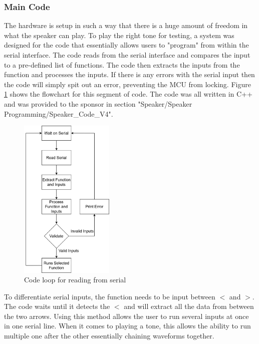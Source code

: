 \subsubsection{Main Code}
The hardware is setup in such a way that there is a huge amount of freedom in what the speaker can play. To play the right tone for testing, a system was designed for the code that essentially allows users to "program" from within the serial interface. The code reads from the serial interface and compares the input to a pre-defined list of functions. The code then extracts the inputs from the function and processes the inputs. If there is any errors with the serial input then the code will simply spit out an error, preventing the MCU from locking. Figure \ref{fig:L_Code_Loop} shows the flowchart for this segment of code. The code was all written in C++ and was provided to the sponsor in section "Speaker/Speaker Programming/Speaker\_Code\_V4". \\
\begin{figure} [!htb]
	\hfill\includegraphics[width=0.4\textwidth]{./images/speaker/L_Code_Loop}\hspace{\fill}
	\caption{Code loop for reading from serial}
	\label{fig:L_Code_Loop}
\end{figure} 

To differentiate serial inputs, the function needs to be input between $<$ and $>$. The code waits until it detects the $<$ and will extract all the data from between the two arrows. Using this method allows the user to run several inputs at once in one serial line. When it comes to playing a tone, this allows the ability to run multiple one after the other essentially chaining waveforms together. \\

